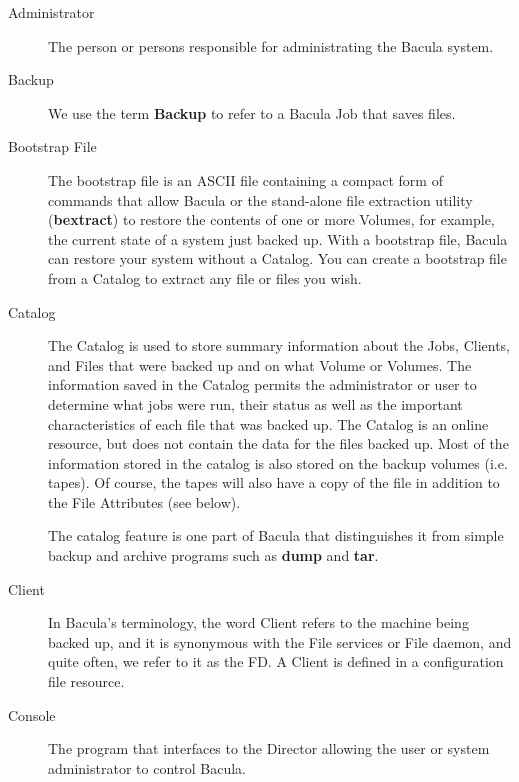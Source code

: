 \begin{description}

\item [Administrator]
   The person or persons responsible for administrating  the Bacula system. 

\item [Backup]
   We use the term {\bf Backup} to refer to a  Bacula Job that saves files. 

\item [Bootstrap File]
   The bootstrap file is an ASCII file  containing a compact form of commands
that allow Bacula or  the stand-alone file extraction utility ({\bf bextract})
to  restore the contents of one or more Volumes, for example, the  current
state of a system just backed up. With a bootstrap file,  Bacula can restore
your system without a Catalog. You can  create a bootstrap file from a Catalog
to extract any file or  files you wish. 

\item [Catalog]
   The Catalog is used to store summary information  about the Jobs, Clients, and
Files that were backed up and on  what Volume or Volumes. The information
saved in the Catalog  permits the administrator or user to determine what jobs
were  run, their status as well as the important characteristics  of each file
that was backed up. The Catalog is an online resource,  but does not contain
the data for the files backed up. Most of  the information stored in the
catalog is also stored on the  backup volumes (i.e. tapes). Of course, the
tapes will also have  a copy of the file in addition to the File Attributes
(see below).  

The catalog feature is one part of Bacula that distinguishes  it from simple
backup and archive programs such as {\bf dump}  and {\bf tar}.  

\item [Client]
   In Bacula's terminology, the word Client  refers to the machine being backed
up, and it is synonymous  with the File services or File daemon, and quite
often, we  refer to it as the FD. A Client is defined in a configuration  file
resource. 

\item [Console]
   The program that interfaces to the Director allowing  the user or system
administrator to control Bacula. 


\end{description}
